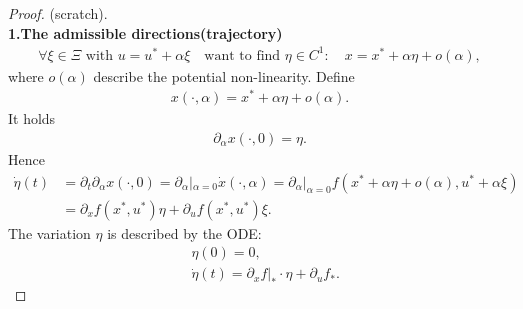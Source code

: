\begin{proof}(scratch).
\quad\\
\textbf{1.The admissible directions(trajectory)}
\begin{align*}
	\forall \xi \in \Xi \text{ with } u = u^* + \alpha \xi \quad \text{want to find } \eta \in C^1:  \quad x = x^* + \alpha \eta + o(\alpha),
\end{align*}
where $o(\alpha)$ describe the potential non-linearity. Define
\begin{align*}
	x(\cdot, \alpha) = x^* + \alpha \eta + o(\alpha).
\end{align*}
It holds
\begin{align*}
	\partial_\alpha x(\cdot, 0) = \eta . 
\end{align*}
Hence
\begin{align*}
	\dot{\eta}(t) &= \partial_t \partial_\alpha x(\cdot, 0) = \partial_\alpha|_{\alpha = 0} \dot{x}(\cdot, \alpha) = \partial_\alpha|_{\alpha = 0}f(x^* + \alpha \eta + o(\alpha), u^* + \alpha \xi)\\
	& = \partial_x f(x^*, u^*) \eta + \partial_uf(x^*, u^*)\xi.
\end{align*}
The variation $\eta$ is described by the ODE:
\begin{equation}
\begin{aligned}
	& \eta(0) = 0, \\
	& \dot{\eta}(t) = \partial_xf|_* \cdot \eta + \partial_u f_*. 
\end{aligned}
\end{equation}


\end{proof}
